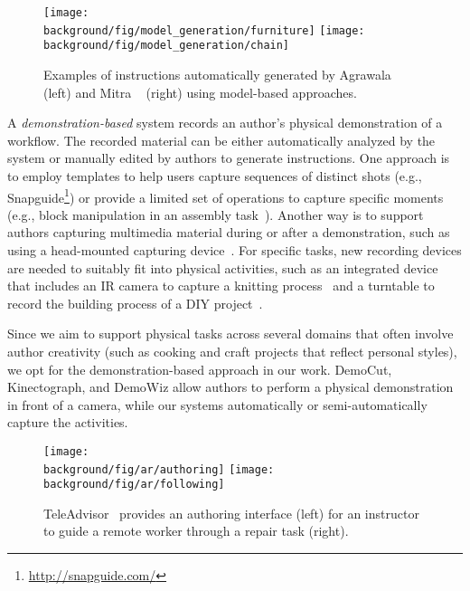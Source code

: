 \begin{figure*}[t!]
  \centering
  \texttt{[image: \\background/fig/model\_generation/furniture]}
  \texttt{[image: \\background/fig/model\_generation/chain]}
  \caption{Examples of instructions automatically generated by Agrawala \ea~\cite{agrawala2003designing} (left) and Mitra \ea~\cite{mitra2010illustrating} (right) using model-based approaches.}
  \label{fig:related_models}
\end{figure*}

A \emph{demonstration-based} system records an author's physical demonstration of a workflow. The recorded material can be either automatically analyzed by the system or manually edited by authors to generate instructions.
%
One approach is to employ templates to help users capture sequences of distinct shots (e.g., Snapguide\footnote{\url{http://snapguide.com/}}) or provide a limited set of operations to capture specific moments (e.g., block manipulation in an assembly task~\cite{Ranjan:2007,Gupta:2012ku}).
%
Another way is to support authors capturing multimedia material during or after a demonstration, such as using a head-mounted capturing device~\cite{carter2015authoring}. For specific tasks, new recording devices are needed to suitably fit into physical activities, such as an integrated device that includes an IR camera to capture a knitting process~\cite{Rosner:2008:SAK:1409635.1409682} and a turntable to record the building process of a DIY project~\cite{Tseng:2015:SPT:2771839.2771869}.

Since we aim to support physical tasks across several domains that often involve author creativity (such as cooking and craft projects that reflect personal styles), we opt for the demonstration-based approach in our work. DemoCut, Kinectograph, and DemoWiz allow authors to perform a physical demonstration in front of a camera, while our systems automatically or semi-automatically capture the activities.


\begin{figure*}[t!]
  \centering
  \texttt{[image: \\background/fig/ar/authoring]}
  \texttt{[image: \\background/fig/ar/following]}
  \caption{TeleAdvisor~\cite{Gurevich:2012ko} provides an authoring interface (left) for an instructor to guide a remote worker through a repair task (right).}
  \label{fig:related_teleadvisor}
\end{figure*}

